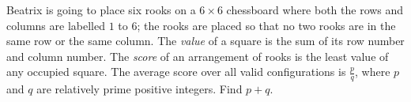 Beatrix is going to place six rooks on a $6\times6$ chessboard where both the rows and columns are labelled $1$ to $6$; the rooks are placed so that no two rooks are in the same row or the same column. The \textit{value} of a square is the sum of its row number and column number. The \textit{score} of an arrangement of rooks is the least value of any occupied square. The average score over all valid configurations is $\frac{p}{q}$, where $p$ and $q$ are relatively prime positive integers. Find $p+q$.